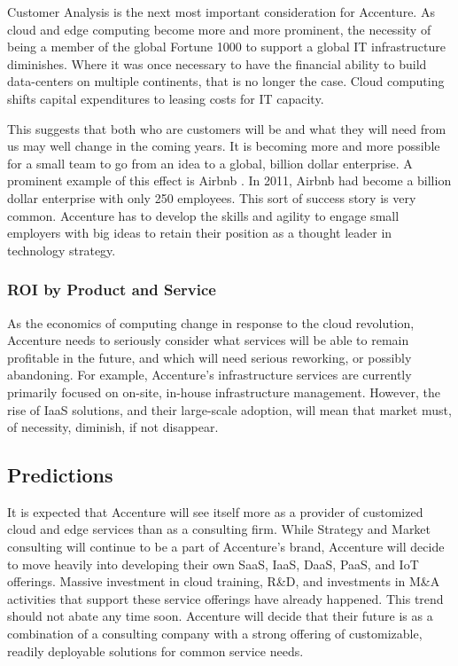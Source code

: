 Customer Analysis is the next most important consideration for Accenture. As cloud and edge computing become more and more prominent, the necessity of being a member of the global Fortune 1000 to support a global IT infrastructure diminishes. Where it was once necessary to have the financial ability to build data-centers on multiple continents, that is no longer the case. Cloud computing shifts capital expenditures to leasing costs for IT capacity.

This suggests that both who are customers will be and what they will need from us may well change in the coming years. It is becoming more and more possible for a small team to go from an idea to a global, billion dollar enterprise. A prominent example of this effect is Airbnb \parencite{zervasRiseSharingEconomy2017}. In 2011, Airbnb had become a billion dollar enterprise with only 250 employees. This sort of success story is very common. Accenture has to develop the skills and agility to engage small employers with big ideas to retain their position as a thought leader in technology strategy.

\subsubsection{ROI by Product and Service}

As the economics of computing change in response to the cloud revolution, Accenture needs to seriously consider what services will be able to remain profitable in the future, and which will need serious reworking, or possibly abandoning. For example, Accenture's infrastructure services are currently primarily focused on on-site, in-house infrastructure management. However, the rise of IaaS solutions, and their large-scale adoption, will mean that market must, of necessity, diminish, if not disappear.

\subsection{Predictions}

It is expected that Accenture will see itself more as a provider of customized cloud and edge services than as a consulting firm. While Strategy and Market consulting will continue to be a part of Accenture's brand, Accenture will decide to move heavily into developing their own SaaS, IaaS, DaaS, PaaS, and IoT offerings. Massive investment in cloud training, R\&D, and investments in M\&A activities that support these service offerings have already happened. This trend should not abate any time soon. Accenture will decide that their future is as a combination of a consulting company with a strong offering of customizable, readily deployable solutions for common service needs.

